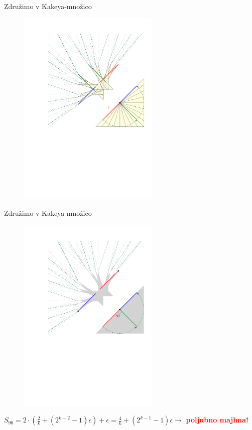 \documentclass{beamer}
\begin{document}
\begin{frame}{Združimo v Kakeya-množico}
    \begin{figure}
        \centering
        \includegraphics[width=0.6\textwidth]{ipe_slike/prehod_skupaj.pdf}
    \end{figure}
\end{frame}

\begin{frame}{Združimo v Kakeya-množico}
    \begin{figure}
        \centering
        \includegraphics[width=0.6\textwidth]{ipe_slike/koncni_lik_90.pdf}
    \end{figure}
    $ S_{90} = 2 \cdot \left( \frac{2}{k} + (2^{k-2} - 1) \epsilon \right) + \epsilon = \frac{4}{k} + (2^{k-1} - 1) \epsilon  \rightarrow $ \textcolor{red}{\textbf{poljubno majhna!}}
\end{frame}
\end{document}
